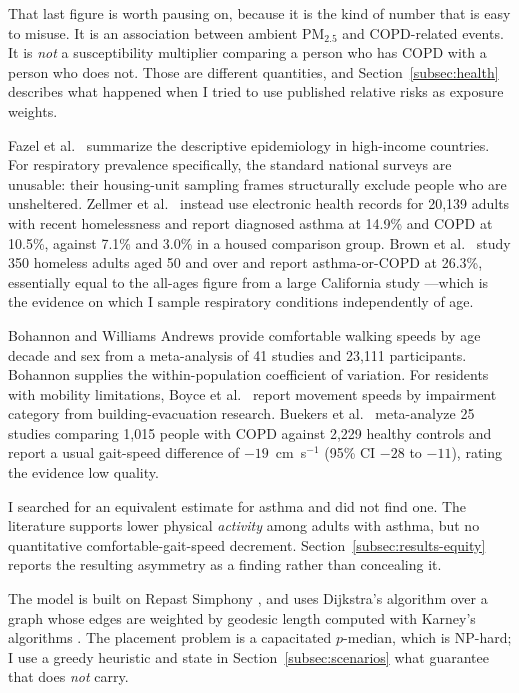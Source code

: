 \documentclass[graybox]{svmult}
\begin{document}
That last figure is worth pausing on, because it is the kind of number that is
easy to misuse. It is an association between ambient PM$_{2.5}$ and COPD-related
events. It is \emph{not} a susceptibility multiplier comparing a person who has
COPD with a person who does not. Those are different quantities, and
Section~\ref{subsec:health} describes what happened when I tried to use
published relative risks as exposure weights.

 Fazel et al.\
\cite{fazel2014health} summarize the descriptive epidemiology in high-income
countries. For respiratory prevalence specifically, the standard national
surveys are unusable: their housing-unit sampling frames structurally exclude
people who are unsheltered. Zellmer et al.\ \cite{zellmer2025} instead use
electronic health records for 20,139 adults with recent homelessness and report
diagnosed asthma at 14.9\% and COPD at 10.5\%, against 7.1\% and 3.0\% in a
housed comparison group. Brown et al.\ \cite{brown2017} study 350 homeless
adults aged 50 and over and report asthma-or-COPD at 26.3\%, essentially equal
to the all-ages figure from a large California study \cite{caspeh2023}---which
is the evidence on which I sample respiratory conditions independently of age.

 Bohannon and Williams Andrews \cite{bohannon2011} provide
comfortable walking speeds by age decade and sex from a meta-analysis of 41
studies and 23,111 participants. Bohannon \cite{bohannon1997} supplies the
within-population coefficient of variation. For residents with mobility
limitations, Boyce et al.\ \cite{boyce1999} report movement speeds by impairment
category from building-evacuation research. Buekers et al.\ \cite{buekers2024}
meta-analyze 25 studies comparing 1,015 people with COPD against 2,229 healthy
controls and report a usual gait-speed difference of $-19$~cm~s$^{-1}$ (95\% CI
$-28$ to $-11$), rating the evidence low quality.

I searched for an equivalent estimate for asthma and did not find one. The
literature supports lower physical \emph{activity} among adults with asthma, but
no quantitative comfortable-gait-speed decrement.
Section~\ref{subsec:results-equity} reports the resulting asymmetry as a finding
rather than concealing it.

 The model is built on Repast
Simphony \cite{north2013}, and uses Dijkstra's algorithm \cite{dijkstra1959}
over a graph whose edges are weighted by geodesic length computed with Karney's
algorithms \cite{karney2013}. The placement problem is a capacitated
$p$-median, which is NP-hard; I use a greedy heuristic and state in
Section~\ref{subsec:scenarios} what guarantee that does \emph{not} carry.
\end{document}
